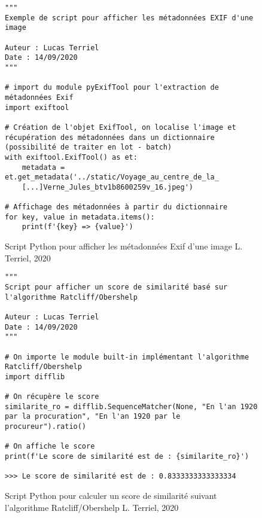 \begin{figure}[h]
\lstset{language=Python}
\begin{lstlisting}
"""
Exemple de script pour afficher les métadonnées EXIF d'une image

Auteur : Lucas Terriel
Date : 14/09/2020
"""

# import du module pyExifTool pour l'extraction de métadonnées Exif
import exiftool

# Création de l'objet ExifTool, on localise l'image et récupération des métadonnées dans un dictionnaire (possibilité de traiter en lot - batch)
with exiftool.ExifTool() as et:
    metadata = et.get_metadata('../static/Voyage_au_centre_de_la_
    [...]Verne_Jules_btv1b8600259v_16.jpeg')

# Affichage des métadonnées à partir du dictionnaire
for key, value in metadata.items():
    print(f'{key} => {value}')

\end{lstlisting}
\caption{Script Python pour afficher les métadonnées Exif d'une image \textcopyright L. Terriel, 2020}
\label{fig:script_python_exif}
\end{figure}

\begin{figure}[h]
\lstset{language=Python}
\begin{lstlisting}
"""
Script pour afficher un score de similarité basé sur l'algorithme Ratcliff/Obershelp

Auteur : Lucas Terriel
Date : 14/09/2020
"""

# On importe le module built-in implémentant l'algorithme Ratcliff/Obershelp
import difflib

# On récupère le score 
similarite_ro = difflib.SequenceMatcher(None, "En l'an 1920 par la procuration", "En l'an 1920 par le procureur").ratio()

# On affiche le score
print(f'Le score de similarité est de : {similarite_ro}')

>>> Le score de similarité est de : 0.8333333333333334

\end{lstlisting}
\caption{Script Python pour calculer un score de similarité suivant l'algorithme Ratcliff/Obershelp  \textcopyright L. Terriel, 2020}
\label{fig:script_calc_RO}
\end{figure}
